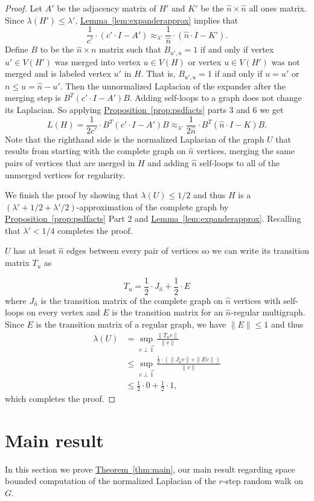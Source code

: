 \documentclass[11pt]{article}
\numberwithin{equation}{section}
\theoremstyle{definition}
\theoremstyle{plain}
\newcommand{\expref}[2]{\hyperref[#2]{#1~\ref{#2}}}
\numberwithin{myalgctr}{section}
\theoremstyle{named}
\begin{document}
\begin{proof}
Let $A'$ be the adjacency matrix of $H'$ and $K'$ be the $\hat{n}\times \hat{n}$ all ones matrix. Since $\lambda(H')\leq\lambda'$, \expref{Lemma}{lem:expanderapprox} implies that 
\[
\frac{1}{c'}\cdot (c'\cdot I- A')\approx_{\lambda'}\frac{1}{\hat{n}}\cdot(\hat{n}\cdot I-K').
\]
Define $B$ to be the $\hat{n}\times n$ matrix such that $B_{u',u}=1$ if and only if vertex $u'\in V(H')$ was merged into vertex $u\in V(H)$ or vertex $u\in V(H')$ was not merged and is labeled vertex $u'$ in $H$. That is, $B_{u',u}=1$ if and only if $u=u'$ or $n\leq u = \hat{n}-u'$. Then the unnormalized Laplacian of the expander after the merging step is $B^{T}(c'\cdot I-A')B$. Adding self-loops to a graph does not change its Laplacian. So applying \expref{Proposition}{prop:psdfacts} parts 3 and 6 we get
\[
L(H) = \frac{1}{2c'}\cdot B^{T}(c'\cdot I-A')B \approx_{\lambda'}\frac{1}{2\hat{n}}\cdot B^{T}(\hat{n}\cdot I-K)B.
\]
Note that the righthand side is the normalized Laplacian of the graph $U$ that results from starting with the complete graph on $\hat{n}$ vertices, merging the same pairs of vertices that are merged in $H$ and adding $\hat{n}$ self-loops to all of the unmerged vertices for regularity.

We finish the proof by showing that $\lambda(U)\leq 1/2$ and thus $H$ is a $(\lambda'+1/2+\lambda'/2)$-approximation of the complete graph by \expref{Proposition}{prop:psdfacts} Part 2 and \expref{Lemma}{lem:expanderapprox}. Recalling that $\lambda'<1/4$ completes the proof.

$U$ has at least $\hat{n}$ edges between every pair of vertices so we can write its transition matrix $T_u$ as 

\[
T_u = \frac{1}{2}\cdot J_{\hat{n}} + \frac{1}{2}\cdot E
\]
where $J_{\hat{n}}$ is the transition matrix of the complete graph on $\hat{n}$ vertices with self-loops on every vertex and $E$ is the transition matrix for an $\hat{n}$-regular multigraph. Since $E$ is the transition matrix of a regular graph, we have $\|E\|\leq 1$ and thus 
\begin{align*}
\lambda(U)&=\sup_{v\perp\vec{1}}\frac{\|T_uv\|}{\|v\|}\\
&\leq \sup_{v\perp\vec{1}}\frac{\frac{1}{2}\cdot(\|J_{\hat{n}}v\|+\|Ev\|)}{\|v\|}\\
&\leq \frac{1}{2}\cdot 0 + \frac{1}{2}\cdot 1,
\end{align*}
which completes the proof.
\end{proof}


%
\section{Main result}
\label{sect:mainresult}
In this section we prove \expref{Theorem}{thm:main}, our main result regarding space bounded computation of the normalized Laplacian of the $r$-step random walk on $G$.
\end{document}
